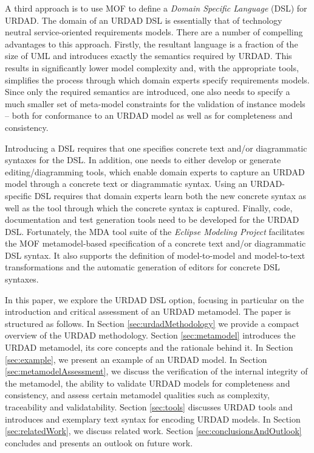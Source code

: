 A third approach is to use MOF to define a {\em Domain Specific Language} (DSL) for URDAD. The domain of an URDAD DSL is essentially that of technology neutral service-oriented requirements models. There are a number of compelling advantages to this approach. Firstly, the resultant language is a fraction of the size of UML and introduces exactly the semantics required by URDAD. This results in significantly lower model complexity and, with the appropriate tools, simplifies the process through which domain experts specify requirements models. Since only the required semantics are introduced, one also needs to specify a much smaller set of meta-model constraints for the validation of instance models -- both for conformance to an URDAD model as well as for completeness and consistency.

Introducing a DSL requires that one specifies concrete text and/or diagrammatic syntaxes for the DSL. In addition, one needs to either develop or generate editing/diagramming tools, which enable domain experts to capture an URDAD model through a concrete text or diagrammatic syntax. Using an URDAD-specific DSL requires that domain experts learn both the new concrete syntax as well as the tool through which the concrete syntax is captured. Finally, code, documentation and test generation tools need to be developed for the URDAD DSL. Fortunately, the MDA tool suite of the {\em Eclipse Modeling Project} \cite{} facilitates the MOF metamodel-based specification of a concrete text and/or diagrammatic DSL syntax. It also supports the definition of model-to-model and model-to-text transformations and the automatic generation of editors for concrete DSL syntaxes.

In this paper, we explore the URDAD DSL option, focusing in particular on the introduction and critical assessment of an URDAD metamodel. The paper is structured as follows. In Section \ref{sec:urdadMethodology} we provide a compact overview of the URDAD methodology. Section \ref{sec:metamodel} introduces the URDAD metamodel, its core concepts and the rationale behind it. In Section \ref{sec:example}, we present an example of an URDAD model. In Section \ref{sec:metamodelAssessment}, we discuss the verification of the internal integrity of the metamodel, the ability to validate URDAD models for completeness and consistency, and assess certain metamodel qualities such as complexity, traceability and validatability. Section \ref{sec:tools} discusses URDAD tools and introduces and exemplary text syntax for encoding URDAD models. In Section \ref{sec:relatedWork}, we discuss related work. Section \ref{sec:conclusionsAndOutlook} concludes and presents an outlook on future work.

